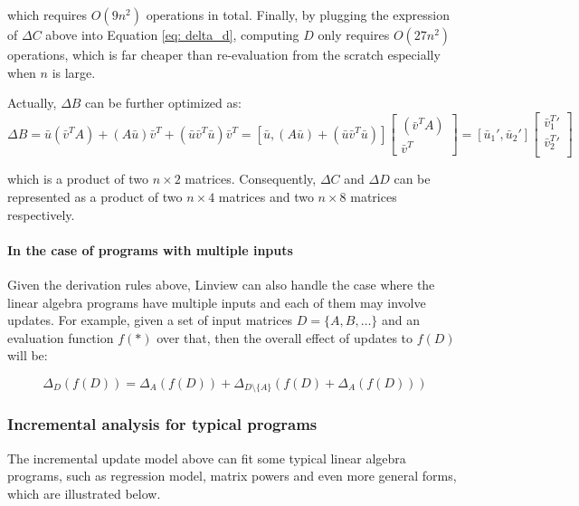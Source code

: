 which requires $O(9n^2)$ operations in total. Finally, by plugging the expression of $\Delta C$ above into Equation \ref{eq: delta_d}, computing $D$ only requires $O(27n^2)$ operations, which is far cheaper than re-evaluation from the scratch especially when $n$ is large.

Actually, $\Delta B$ can be further optimized as:
\begin{equation}\label{eq: update_b_product_opt}
\Delta B = \bar{u}(\bar{v}^TA) + (A\bar{u})\bar{v}^T + (\bar{u}\bar{v}^T\bar{u})\bar{v}^T=[\bar{u}, (A\bar{u}) + (\bar{u}\bar{v}^T\bar{u})]
\begin{bmatrix}
    (\bar{v}^TA)  \\
    \bar{v}^T 
\end{bmatrix}
=[\bar{u}_1', \bar{u}_2']
\begin{bmatrix}
    \bar{v}^T_1'  \\
    \bar{v}^T_2'  \\
\end{bmatrix}
\end{equation}

which is a product of two $n \times 2$ matrices. Consequently, $\Delta C$ and $\Delta D$ can be represented as a product of two $n \times 4$ matrices and two $n \times 8$ matrices respectively.

\paragraph{In the case of programs with multiple inputs}
Given the derivation rules above, Linview can also handle the case where the linear algebra programs have multiple inputs and each of them may involve updates. For example, given a set of input matrices $D=\{A, B, \dots\}$ and an evaluation function $f(*)$ over that, then the overall effect of updates to $f(D)$ will be:

\begin{equation}\label{eq: updates_by_multi_vars}
\Delta_{D}(f(D)) = \Delta_{A}(f(D)) + \Delta_{D \setminus \{A\}}(f(D) + \Delta_{A}(f(D)))
\end{equation}



\subsubsection{Incremental analysis for typical programs}\label{sec: analysis_typical_programs}
The incremental update model above can fit some typical linear algebra programs, such as regression model, matrix powers and even more general forms, which are illustrated below.


